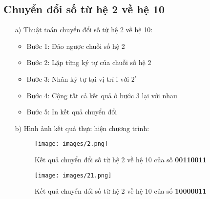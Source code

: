 \documentclass[20pt]{article}
\begin{document}
\subsection{Chuyển đổi số từ hệ 2 về hệ 10}
\begin{enumerate}
    \item[a)] Thuật toán chuyển đổi số từ hệ 2 về hệ 10:
    \begin{itemize}
        \item Bước 1: Đảo ngược chuỗi số hệ 2
        \item Bước 2: Lặp từng ký tự của chuỗi số hệ 2
        \item Bước 3: Nhân ký tự tại vị trí i với $2^i$
        \item Bước 4: Cộng tất cả kết quả ở bước 3 lại với nhau
        \item Bước 5: In kết quả chuyển đổi
    \end{itemize}
    \item[b)] Hình ảnh kết quả thực hiện chương trình:
    \begin{figure}[H]
        \centering
        \texttt{[image: images/2.png]}
        \caption{Kết quả chuyển đổi số từ hệ 2 về hệ 10 của số \textbf{00110011}}
        \label{fig:my_label}
    \end{figure}
    \begin{figure}[H]
        \centering
        \texttt{[image: images/21.png]}
        \caption{Kết quả chuyển đổi số từ hệ 2 về hệ 10 của số \textbf{10000011}}
        \label{fig:my_label}
    \end{figure}
\end{enumerate}
\end{document}
